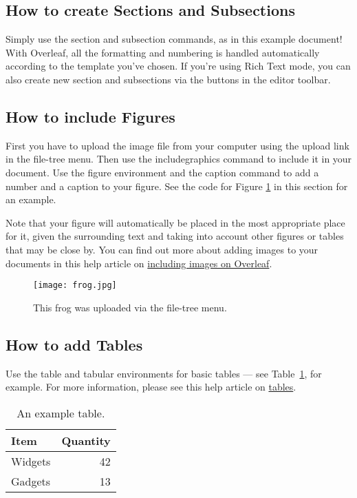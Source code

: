 \documentclass{article}
\begin{document}
\subsection{How to create Sections and Subsections}

Simply use the section and subsection commands, as in this example document! With Overleaf, all the formatting and numbering is handled automatically according to the template you've chosen. If you're using Rich Text mode, you can also create new section and subsections via the buttons in the editor toolbar.

\subsection{How to include Figures}

First you have to upload the image file from your computer using the upload link in the file-tree menu. Then use the includegraphics command to include it in your document. Use the figure environment and the caption command to add a number and a caption to your figure. See the code for Figure \ref{fig:frog} in this section for an example.

Note that your figure will automatically be placed in the most appropriate place for it, given the surrounding text and taking into account other figures or tables that may be close by. You can find out more about adding images to your documents in this help article on \href{https://www.overleaf.com/learn/how-to/Including_images_on_Overleaf}{including images on Overleaf}.

\begin{figure}
\centering
\texttt{[image: frog.jpg]}
\caption{\label{fig:frog}This frog was uploaded via the file-tree menu.}
\end{figure}

\subsection{How to add Tables}

Use the table and tabular environments for basic tables --- see Table~\ref{tab:widgets}, for example. For more information, please see this help article on \href{https://www.overleaf.com/learn/latex/tables}{tables}. 

\begin{table}
\centering
\begin{tabular}{l|r}
Item & Quantity \\\hline
Widgets & 42 \\
Gadgets & 13
\end{tabular}
\caption{\label{tab:widgets}An example table.}
\end{table}
\end{document}

